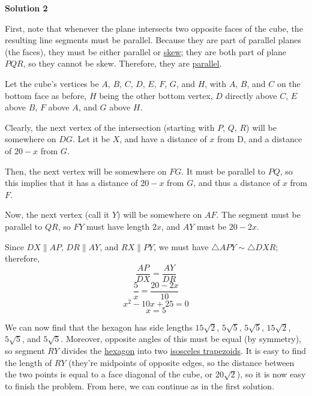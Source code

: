 \begin{enumerate}
 



\textbf{Solution 2}

First, note that whenever the plane intersects two opposite faces of the cube, the resulting line segments must be parallel.  Because they are part of parallel planes (the faces), they must be either parallel or \href{https://artofproblemsolving.com/wiki/index.php?title=Skew}{skew}; they are both part of plane $PQR$, so they cannot be skew.  Therefore, they are \href{https://artofproblemsolving.com/wiki/index.php?title=Parallel}{parallel}.

 Let the cube's vertices be $A$, $B$, $C$, $D$, $E$, $F$, $G$, and $H$, with $A$, $B$, and $C$ on the bottom face as before, $H$ being the other bottom vertex, $D$ directly above $C$, $E$ above $B$, $F$ above $A$, and $G$ above $H$.

 Clearly, the next vertex of the intersection (starting with $P$, $Q$, $R$) will be somewhere on $DG$.  Let it be $X$, and have a distance of $x$ from D, and a distance of $20 - x$ from $G$.

 Then, the next vertex will be somewhere on $FG$.  It must be parallel to $PQ$, so this implies that it has a distance of $20 - x$ from $G$, and thus a distance of $x$ from $F$.

 Now, the next vertex (call it $Y$) will be somewhere on $AF$.  The segment must be parallel to $QR$, so $FY$ must have length $2x$,  and $AY$ must be $20 - 2x$.

 Since $DX \parallel AP$, $DR \parallel AY$, and $RX \parallel PY$, we must have $\triangle{APY} \sim \triangle{DXR}$; therefore, 
 \[\frac{AP}{DX}=\frac{AY}{DR}\] 
 \[\frac{5}{x}=\frac{20-2x}{10}\] 
 \[x^{2}-10x+25=0\] 
 \[x=5\]

 We can now find that the hexagon has side lengths $15\sqrt {2}$, $5\sqrt {5}$, $5\sqrt {5}$, $15\sqrt {2}$, $5\sqrt {5}$, and $5\sqrt {5}$.  Moreover, opposite angles of this must be equal (by symmetry), so segment $RY$ divides the \href{https://artofproblemsolving.com/wiki/index.php?title=Hexagon}{hexagon} into two \href{https://artofproblemsolving.com/wiki/index.php?title=Isosceles\_trapezoid}{isosceles trapezoids}.  It is easy to find the length of $RY$ (they're midpoints of opposite edges, so the distance between the two points is equal to a face diagonal of the cube, or $20\sqrt {2}$), so it is now easy to finish the problem. From here, we can continue as in the first solution.

 



\end{enumerate}
